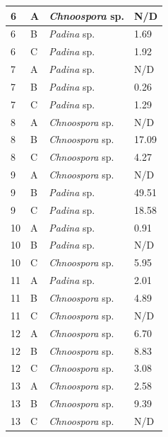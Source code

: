 \documentclass[12pt]{article}
\begin{document}
\begin{longtable}{ | p{2cm} | p{2cm} | p{3cm} | p{3.5cm} |}
6&A&%
\emph{Chnoospora} sp.&N/D\\ %
\hline
6&B&\emph{Padina} sp.&1.69
\\
\hline
6&C&\emph{Padina} sp.&1.92
\\
\hline
7 %
&A&
\emph{Padina} sp. %
&N/D\\
\hline
7 
&B&\emph{Padina} sp. %
&0.26\\
\hline
7 
&C&\emph{Padina} sp. %
&1.29\\
\hline
8&A&\emph{Chnoospora} sp.&N/D\\ %
\hline
8&B&\emph{Chnoospora} sp.&17.09
\\
\hline
8&C&\emph{Chnoospora} sp.&4.27
\\
\hline
9&A&\emph{Chnoospora} sp.&N/D\\
\hline
9&B&\emph{Padina} sp. %
&49.51
\\
\hline
9&C&\emph{Padina} sp. %
&18.58 %
\\
\hline
10&A&\emph{Padina} sp. %
&0.91
\\
\hline
10&B&\emph{Padina} sp. %
&N/D\\
\hline
10&C&\emph{Chnoospora} sp.&5.95
\\
\hline
11&A&\emph{Padina} sp. %
&2.01 %
\\
\hline
11&B&\emph{Chnoospora} sp.&4.89
\\
\hline
11&C&\emph{Chnoospora} sp.&N/D\\
\hline
12&A&\emph{Chnoospora} sp.&6.70\\
\hline
12&B&\emph{Chnoospora} sp.&8.83
\\
\hline
12&C&\emph{Chnoospora} sp.&3.08
\\
\hline
13&A&\emph{Chnoospora} sp.&2.58 %
\\
\hline
13&B&\emph{Chnoospora} sp.&9.39
\\
\hline
13&C&%
\emph{Chnoospora} sp.&N/D\\

\end{longtable}
\end{document}
